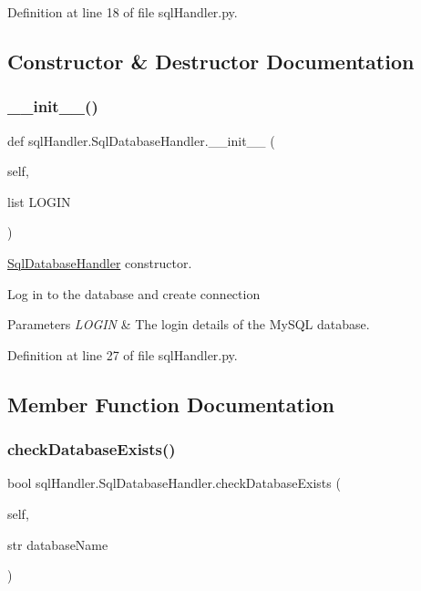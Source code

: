 Definition at line 18 of file sql\+Handler.\+py.



\subsection{Constructor \& Destructor Documentation}
\mbox{\label{classsql_handler_1_1_sql_database_handler_aff05f8cdf5dc7abaf85ea55df8f1fb90}} 
\subsubsection{\texorpdfstring{\_\_init\_\_()}{\_\_init\_\_()}}
{\footnotesize\ttfamily def sql\+Handler.\+Sql\+Database\+Handler.\+\_\+\+\_\+init\+\_\+\+\_\+ (\begin{DoxyParamCaption}\item[{}]{self,  }\item[{list}]{L\+O\+G\+IN }\end{DoxyParamCaption})}



\mbox{\hyperlink{classsql_handler_1_1_sql_database_handler}{Sql\+Database\+Handler}} constructor. 

Log in to the database and create connection 
\begin{DoxyParams}{Parameters}
{\em L\+O\+G\+IN} & The login details of the My\+S\+QL database. \\
\hline
\end{DoxyParams}


Definition at line 27 of file sql\+Handler.\+py.



\subsection{Member Function Documentation}
\mbox{\label{classsql_handler_1_1_sql_database_handler_ac9f54dee141b8b162f459f99393ef888}} 
\subsubsection{\texorpdfstring{checkDatabaseExists()}{checkDatabaseExists()}}
{\footnotesize\ttfamily  bool sql\+Handler.\+Sql\+Database\+Handler.\+check\+Database\+Exists (\begin{DoxyParamCaption}\item[{}]{self,  }\item[{str}]{database\+Name }\end{DoxyParamCaption})}




